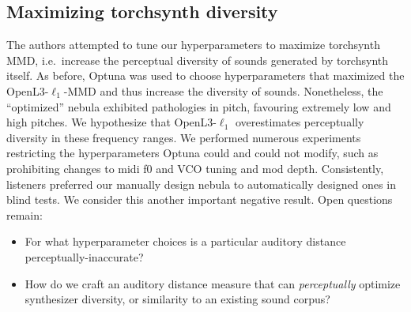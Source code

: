 \subsection{Maximizing torchsynth diversity}
\label{sec:diversity}

The authors attempted to tune our hyperparameters to maximize torchsynth MMD, i.e.\ increase the perceptual diversity of sounds generated by torchsynth itself. As before, Optuna was used to choose hyperparameters that maximized the OpenL3-$\ell_1$-MMD and thus increase the diversity of sounds. Nonetheless, the ``optimized'' nebula exhibited pathologies in pitch, favouring extremely low and high pitches. We hypothesize that OpenL3-$\ell_1$ overestimates perceptually diversity in these frequency ranges. We performed numerous experiments restricting the hyperparameters Optuna could and could not modify, such as prohibiting changes to midi f0 and VCO tuning and mod depth. Consistently, listeners preferred our manually design nebula to automatically designed ones in blind tests. We consider this another important negative result. Open questions remain:
\begin{itemize}
    \item For what hyperparameter choices is a particular auditory distance perceptually-inaccurate?
    \item How do we craft an auditory distance measure that can {\em perceptually} optimize synthesizer diversity, or similarity to an existing sound corpus?
\end{itemize} 

